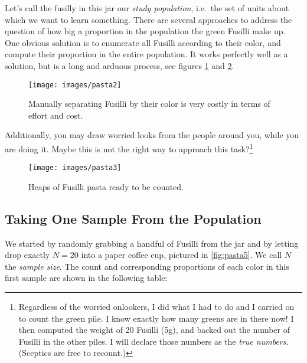 \documentclass[]{book}
\begin{document}
Let's call the fusilly in this jar our \emph{study population}, i.e.~the set of units about which we want to learn something. There are several approaches to address the question of how big a proportion in the population the green Fusilli make up. One obvious solution is to enumerate all Fusilli according to their color, and compute their proportion in the entire population. It works perfectly well as a solution, but is a long and arduous process, see figures \ref{fig:pasta2} and \ref{fig:pasta3}.

\begin{figure}

{\centering \texttt{[image: images/pasta2]} 

}

\caption{Manually separating Fusilli by their color is very costly in terms of effort and cost.}\label{fig:pasta2}
\end{figure}

Additionally, you may draw worried looks from the people around you, while you are doing it. Maybe this is not the right way to approach this task?\footnote{Regardless of the worried onlookers, I did what I had to do and I carried on to count the green pile. I know exactly how many greens are in there now! I then computed the weight of 20 Fusilli (5g), and backed out the number of Fusilli in the other piles. I will declare those numbers as the \emph{true numbers}. (Sceptics are free to recount.)}

\begin{figure}

{\centering \texttt{[image: images/pasta3]} 

}

\caption{Heaps of Fusilli pasta ready to be counted.}\label{fig:pasta3}
\end{figure}

\hypertarget{taking-one-sample-from-the-population}{%
\subsection{Taking One Sample From the Population}\label{taking-one-sample-from-the-population}}

We started by randomly grabbing a handful of Fusilli from the jar and by letting drop exactly \(N=20\) into a paper coffee cup, pictured in \ref{fig:pasta5}. We call \(N\) the \emph{sample size}. The count and corresponding proportions of each color in this first sample are shown in the following table:
\end{document}
